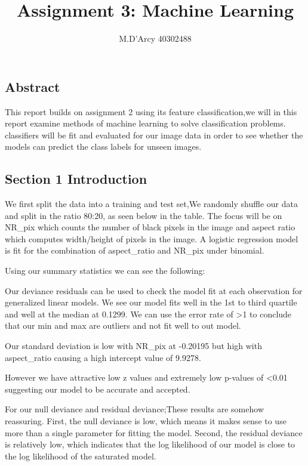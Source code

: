 \documentclass[
]{article}
\title{Assignment 3: Machine Learning}
\author{M.D'Arcy 40302488}
\date{}
\begin{document}
\maketitle

\hypertarget{abstract}{%
\subsection{Abstract}\label{abstract}}

This report builds on assignment 2 using its feature classification,we
will in this report examine methods of machine learning to solve
classification problems. classifiers will be fit and evaluated for our
image data in order to see whether the models can predict the class
labels for unseen images.

\hypertarget{section-1-introduction}{%
\subsection{Section 1 Introduction}\label{section-1-introduction}}

We first split the data into a training and test set,We randomly shuffle
our data and split in the ratio 80:20, as seen below in the table. The
focus will be on NR\_pix which counts the number of black pixels in the
image and aspect ratio which computes width/height of pixels in the
image. A logistic regression model is fit for the combination of
aspect\_ratio and NR\_pix under binomial.

Using our summary statistics we can see the following:

Our deviance residuals can be used to check the model fit at each
observation for generalized linear models. We see our model fits well in
the 1st to third quartile and well at the median at 0.1299. We can use
the error rate of \textgreater1 to conclude that our min and max are
outliers and not fit well to out model.

Our standard deviation is low with NR\_pix at -0.20195 but high with
aspect\_ratio causing a high intercept value of 9.9278.

However we have attractive low z values and extremely low p-values of
\textless0.01 suggesting our model to be accurate and accepted.

For our null deviance and residual deviance;These results are somehow
reassuring. First, the null deviance is low, which means it makes sense
to use more than a single parameter for fitting the model. Second, the
residual deviance is relatively low, which indicates that the log
likelihood of our model is close to the log likelihood of the saturated
model.
\end{document}
